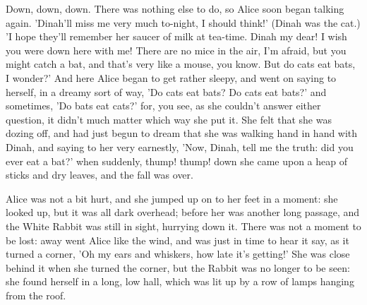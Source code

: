 \documentclass[12pt]{article}
\begin{document}
Down, down, down. There was nothing else to do, so Alice soon began
talking again. ’Dinah’ll miss me very much to-night, I should think!’
(Dinah was the cat.) ’I hope they’ll remember her saucer of milk at
tea-time. Dinah my dear! I wish you were down here with me! There are no
mice in the air, I’m afraid, but you might catch a bat, and that’s very
like a mouse, you know. But do cats eat bats, I wonder?’ And here Alice
began to get rather sleepy, and went on saying to herself, in a dreamy
sort of way, ’Do cats eat bats? Do cats eat bats?’ and sometimes, ’Do
bats eat cats?’ for, you see, as she couldn’t answer either question,
it didn’t much matter which way she put it. She felt that she was dozing
off, and had just begun to dream that she was walking hand in hand with
Dinah, and saying to her very earnestly, ’Now, Dinah, tell me the truth:
did you ever eat a bat?’ when suddenly, thump! thump! down she came upon
a heap of sticks and dry leaves, and the fall was over.

Alice was not a bit hurt, and she jumped up on to her feet in a moment:
she looked up, but it was all dark overhead; before her was another
long passage, and the White Rabbit was still in sight, hurrying down it.
There was not a moment to be lost: away went Alice like the wind, and
was just in time to hear it say, as it turned a corner, ’Oh my ears
and whiskers, how late it’s getting!’ She was close behind it when she
turned the corner, but the Rabbit was no longer to be seen: she found
herself in a long, low hall, which was lit up by a row of lamps hanging
from the roof.
\end{document}
